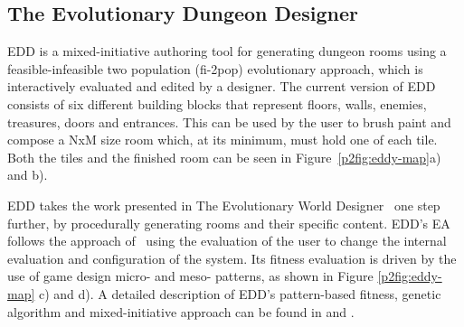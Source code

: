 



\subsection{The Evolutionary Dungeon Designer}

EDD is a mixed-initiative authoring tool for generating dungeon rooms using a feasible-infeasible two population (fi-2pop) evolutionary approach, which is interactively evaluated and edited by a designer. The current version of EDD consists of six different building blocks that represent floors, walls, enemies, treasures, doors and entrances. This can be used by the user to brush paint and compose a NxM size room which, at its minimum, must hold one of each tile. Both the tiles and the finished room can be seen in Figure~\ref{p2fig:eddy-map}a) and b).

EDD takes the work presented in The Evolutionary World Designer~\cite{Font2016ConstrainedAlgorithms} one step further, by procedurally generating rooms and their specific content. EDD's EA follows the approach of~\citet{Liapis2012AdaptingCreation} using the evaluation of the user to change the internal evaluation and configuration of the system. Its fitness evaluation is driven by the use of game design micro- and meso- patterns, as shown in Figure \ref{p2fig:eddy-map} c) and d). A detailed description of EDD's pattern-based fitness, genetic algorithm and mixed-initiative approach can be found in \cite{Baldwin2017Mixed-initiativePatterns} and \cite{Baldwin2017TowardsGeneration}.